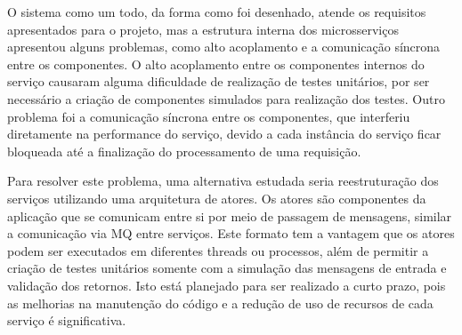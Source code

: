 O sistema como um todo, da forma como foi desenhado, atende os requisitos
apresentados para o projeto, mas a estrutura interna dos microsserviços
apresentou alguns problemas, como alto acoplamento e a comunicação síncrona
entre os componentes. O alto acoplamento entre os componentes internos do
serviço causaram alguma dificuldade de realização de testes unitários, por
ser necessário a criação de componentes simulados para realização dos testes.
Outro problema foi a comunicação síncrona entre os componentes, que
interferiu diretamente na performance do serviço, devido a cada instância do
serviço ficar bloqueada até a finalização do processamento de uma requisição.

Para resolver este problema, uma alternativa estudada seria reestruturação
dos serviços utilizando uma arquitetura de atores. Os atores são componentes
da aplicação que se comunicam entre si por meio de passagem de mensagens,
similar a comunicação via \ac{MQ} entre serviços. Este formato tem a vantagem
que os atores podem ser executados em diferentes threads ou processos,
além de permitir a criação de testes unitários somente com a simulação das
mensagens de entrada e validação dos retornos. Isto está planejado para ser
realizado a curto prazo, pois as melhorias na manutenção do código e a
redução de uso de recursos de cada serviço é significativa.
